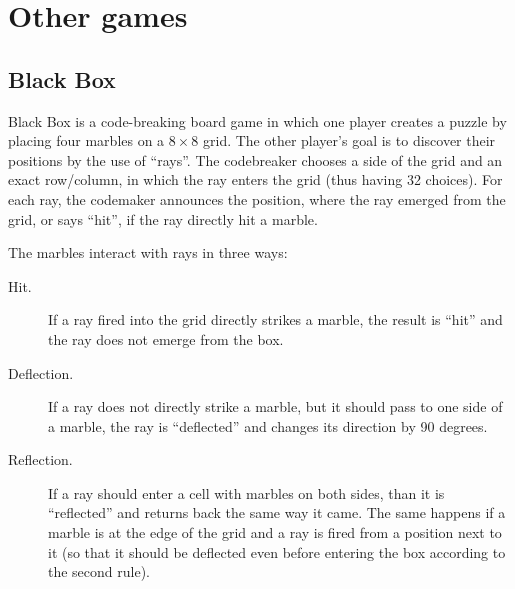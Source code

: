 \section{Other games}
\subsection{Black Box}

Black Box is a code-breaking board game in which one player creates a
  puzzle by placing four marbles on a $8\times 8$ grid.
The other player's goal is to discover their positions
  by the use of ``rays''.
The codebreaker chooses a side of the grid and an exact row/column, in which
  the ray enters the grid (thus having 32 choices).
For each ray, the codemaker announces the position, where the ray emerged from the grid,
  or says ``hit'', if the ray directly hit a marble\cite{blackbox}.

The marbles interact with rays in three ways:
\begin{description}
\item[Hit.] If a ray fired into the grid directly strikes a marble,
  the result is ``hit'' and the ray does not emerge from the box.
\item[Deflection.] If a ray does not directly strike a marble,
  but it should pass to one side of a marble, the ray is
  ``deflected'' and changes its direction by 90 degrees.
\item[Reflection.] If a ray should enter a cell with marbles on both sides,
  than it is ``reflected'' and returns back the same way it came.
  The same happens if a marble is at the edge of the grid
  and a ray is fired from a position next to it (so that it should be deflected
  even before entering the box according to the second rule).
\end{description}

